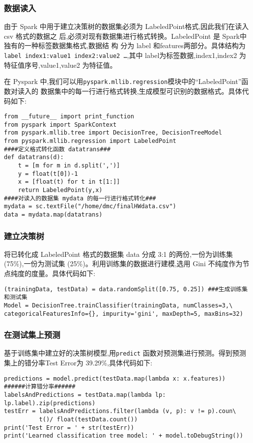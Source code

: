 \subsubsection{数据读入}\label{ux6570ux636eux8bfbux5165}

由于 Spark 中用于建立决策树的数据集必须为 LabeledPoint格式,因此我们在读入 csv 格式的数据之
后,必须对现有数据集进行格式转换。LabeledPoint 是 Spark中独有的一种标签数据集格式,数据结 构
分为 label 和features两部分。具体结构为\texttt{label index1:value1 index2:value2
  \ldots{}},其中 label为标签数据,index1,index2 为特征值序号,value1,value2 为特征值。

在 Pyspark 中,我们可以用\texttt{pyspark.mllib.regression}模块中的“LabeledPoint”函数对读入的
数据集中的每一行进行格式转换,生成模型可识别的数据格式。具体代码如下:

\begin{lstlisting}
from __future__ import print_function
from pyspark import SparkContext
from pyspark.mllib.tree import DecisionTree, DecisionTreeModel
from pyspark.mllib.regression import LabeledPoint
####定义格式转化函数 datatrans###
def datatrans(d):
    t = [m for m in d.split(',')]
    y = float(t[0])-1
    x = [float(t) for t in t[1:]]
    return LabeledPoint(y,x)
####对读入的数据集 mydata 的每一行进行格式转化###
mydata = sc.textFile("/home/dmc/finalHWdata.csv")
data = mydata.map(datatrans)
\end{lstlisting}

\subsubsection{建立决策树}\label{ux5efaux7acbux51b3ux7b56ux6811}

将已转化成 LabeledPoint 格式的数据集 data 分成 3:1
的两份,一份为训练集(75\%),一份为测试集
(25\%)。利用训练集的数据进行建模,选用 Gini
不纯度作为节点纯度的度量。具体代码如下:

\begin{lstlisting}
(trainingData, testData) = data.randomSplit([0.75, 0.25]) ###生成训练集和测试集
Model = DecisionTree.trainClassifier(trainingData, numClasses=3,\
categoricalFeaturesInfo={}, impurity='gini', maxDepth=5, maxBins=32)
\end{lstlisting}

\subsubsection{在测试集上预测}\label{ux5728ux6d4bux8bd5ux96c6ux4e0aux9884ux6d4b}

基于训练集中建立好的决策树模型,用\texttt{predict}
函数对预测集进行预测。得到预测集上的错分率Test Error为
39.29\%,具体代码如下:

\begin{lstlisting}
predictions = model.predict(testData.map(lambda x: x.features))
######计算错分率######
labelsAndPredictions = testData.map(lambda lp: lp.label).zip(predictions)
testErr = labelsAndPredictions.filter(lambda (v, p): v != p).coun\
          t()/ float(testData.count())
print('Test Error = ' + str(testErr))
print('Learned classification tree model: ' + model.toDebugString())
\end{lstlisting}

